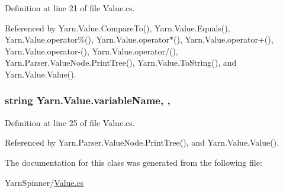 Definition at line 21 of file Value.\-cs.



Referenced by Yarn.\-Value.\-Compare\-To(), Yarn.\-Value.\-Equals(), Yarn.\-Value.\-operator\%(), Yarn.\-Value.\-operator$\ast$(), Yarn.\-Value.\-operator+(), Yarn.\-Value.\-operator-\/(), Yarn.\-Value.\-operator/(), Yarn.\-Parser.\-Value\-Node.\-Print\-Tree(), Yarn.\-Value.\-To\-String(), and Yarn.\-Value.\-Value().

\hypertarget{a00187_a8ee2b09b7d28eaf97bf63c74d0023bfd}{
\subsubsection[{variable\-Name}]{\setlength{\rightskip}{0pt plus 5cm}string Yarn.\-Value.\-variable\-Name\hspace{0.3cm}{\ttfamily [get]}, {\ttfamily [set]}, {\ttfamily [package]}}}\label{a00187_a8ee2b09b7d28eaf97bf63c74d0023bfd}


Definition at line 25 of file Value.\-cs.



Referenced by Yarn.\-Parser.\-Value\-Node.\-Print\-Tree(), and Yarn.\-Value.\-Value().



The documentation for this class was generated from the following file\-:\begin{DoxyCompactItemize}
\item 
Yarn\-Spinner/\hyperlink{a00315}{Value.\-cs}\end{DoxyCompactItemize}
